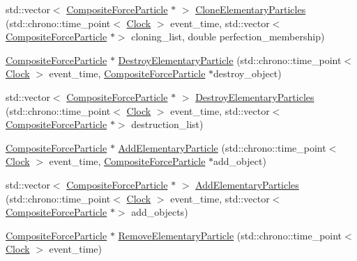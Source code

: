 \begin{DoxyCompactItemize}
\item 
std\+::vector$<$ \mbox{\hyperlink{classCompositeForceParticle}{Composite\+Force\+Particle}} $\ast$ $>$ \mbox{\hyperlink{classCompositeForceParticle_ac27e6d3bb56272728a8c197dbcd2db4e}{Clone\+Elementary\+Particles}} (std\+::chrono\+::time\+\_\+point$<$ \mbox{\hyperlink{universe_8h_a0ef8d951d1ca5ab3cfaf7ab4c7a6fd80}{Clock}} $>$ event\+\_\+time, std\+::vector$<$ \mbox{\hyperlink{classCompositeForceParticle}{Composite\+Force\+Particle}} $\ast$$>$ cloning\+\_\+list, double perfection\+\_\+membership)
\item 
\mbox{\hyperlink{classCompositeForceParticle}{Composite\+Force\+Particle}} $\ast$ \mbox{\hyperlink{classCompositeForceParticle_ac176d2e41d75e308d4b510f3338d8b9e}{Destroy\+Elementary\+Particle}} (std\+::chrono\+::time\+\_\+point$<$ \mbox{\hyperlink{universe_8h_a0ef8d951d1ca5ab3cfaf7ab4c7a6fd80}{Clock}} $>$ event\+\_\+time, \mbox{\hyperlink{classCompositeForceParticle}{Composite\+Force\+Particle}} $\ast$destroy\+\_\+object)
\item 
std\+::vector$<$ \mbox{\hyperlink{classCompositeForceParticle}{Composite\+Force\+Particle}} $\ast$ $>$ \mbox{\hyperlink{classCompositeForceParticle_a602ef5e477db576e47c36436b83f80f5}{Destroy\+Elementary\+Particles}} (std\+::chrono\+::time\+\_\+point$<$ \mbox{\hyperlink{universe_8h_a0ef8d951d1ca5ab3cfaf7ab4c7a6fd80}{Clock}} $>$ event\+\_\+time, std\+::vector$<$ \mbox{\hyperlink{classCompositeForceParticle}{Composite\+Force\+Particle}} $\ast$$>$ destruction\+\_\+list)
\item 
\mbox{\hyperlink{classCompositeForceParticle}{Composite\+Force\+Particle}} $\ast$ \mbox{\hyperlink{classCompositeForceParticle_a27924093abdaa2f19902a32a068fa324}{Add\+Elementary\+Particle}} (std\+::chrono\+::time\+\_\+point$<$ \mbox{\hyperlink{universe_8h_a0ef8d951d1ca5ab3cfaf7ab4c7a6fd80}{Clock}} $>$ event\+\_\+time, \mbox{\hyperlink{classCompositeForceParticle}{Composite\+Force\+Particle}} $\ast$add\+\_\+object)
\item 
std\+::vector$<$ \mbox{\hyperlink{classCompositeForceParticle}{Composite\+Force\+Particle}} $\ast$ $>$ \mbox{\hyperlink{classCompositeForceParticle_a2b88f000067b5d430d1850e75b733f56}{Add\+Elementary\+Particles}} (std\+::chrono\+::time\+\_\+point$<$ \mbox{\hyperlink{universe_8h_a0ef8d951d1ca5ab3cfaf7ab4c7a6fd80}{Clock}} $>$ event\+\_\+time, std\+::vector$<$ \mbox{\hyperlink{classCompositeForceParticle}{Composite\+Force\+Particle}} $\ast$$>$ add\+\_\+objects)
\item 
\mbox{\hyperlink{classCompositeForceParticle}{Composite\+Force\+Particle}} $\ast$ \mbox{\hyperlink{classCompositeForceParticle_ab63c4a1d5734f1d13806cb9463075a40}{Remove\+Elementary\+Particle}} (std\+::chrono\+::time\+\_\+point$<$ \mbox{\hyperlink{universe_8h_a0ef8d951d1ca5ab3cfaf7ab4c7a6fd80}{Clock}} $>$ event\+\_\+time)
$$
\end{DoxyCompactItemize}
